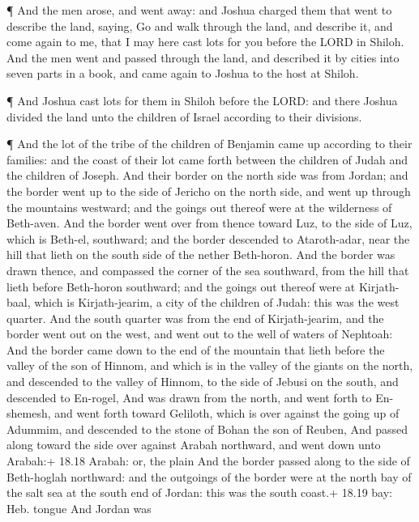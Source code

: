  ¶ And the men arose, and went away: and Joshua charged them
that went to describe the land, saying, Go and walk through the land,
and describe it, and come again to me, that I may here cast lots for you
before the LORD in Shiloh.  And the men went and passed
through the land, and described it by cities into seven parts in a book,
and came again to Joshua to the host at Shiloh.

 ¶ And Joshua cast lots for them in Shiloh before the LORD:
and there Joshua divided the land unto the children of Israel according
to their divisions.

 ¶ And the lot of the tribe of the children of Benjamin
came up according to their families: and the coast of their lot came
forth between the children of Judah and the children of Joseph.
 And their border on the north side was from Jordan; and
the border went up to the side of Jericho on the north side, and went up
through the mountains westward; and the goings out thereof were at the
wilderness of Beth-aven.  And the border went over from
thence toward Luz, to the side of Luz, which is Beth-el, southward; and
the border descended to Ataroth-adar, near the hill that lieth on the
south side of the nether Beth-horon.  And the border was
drawn thence, and compassed the corner of the sea southward, from the
hill that lieth before Beth-horon southward; and the goings out thereof
were at Kirjath-baal, which is Kirjath-jearim, a city of the children of
Judah: this was the west quarter.  And the south quarter
was from the end of Kirjath-jearim, and the border went out on the west,
and went out to the well of waters of Nephtoah:  And the
border came down to the end of the mountain that lieth before the valley
of the son of Hinnom, and which is in the valley of the giants on the
north, and descended to the valley of Hinnom, to the side of Jebusi on
the south, and descended to En-rogel,  And was drawn from
the north, and went forth to En-shemesh, and went forth toward Geliloth,
which is over against the going up of Adummim, and descended to the
stone of Bohan the son of Reuben,  And passed along toward
the side over against Arabah northward, and went down unto Arabah:+
18.18 Arabah: or, the plain  And the border passed along to
the side of Beth-hoglah northward: and the outgoings of the border were
at the north bay of the salt sea at the south end of Jordan: this was
the south coast.+ 18.19 bay: Heb. tongue  And Jordan was
